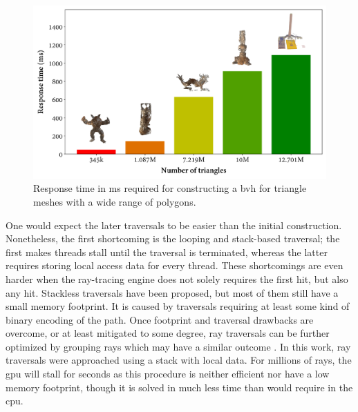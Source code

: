 \begin{figure}[ht]
    \includegraphics{figs/fundamentals/bvh_time.png}
	\caption{Response time in \si{\milli\second} required for constructing a \acrshort{bvh} for triangle meshes with a wide range of polygons. }
    \label{fig:bvh_time}
\end{figure}

One would expect the later traversals to be easier than the initial construction. Nonetheless, the first shortcoming is the looping and stack-based traversal; the first makes threads stall until the traversal is terminated, whereas the latter requires storing local access data for every thread. These shortcomings are even harder when the ray-tracing engine does not solely requires the first hit, but also any hit. Stackless traversals have been proposed, but most of them still have a small memory footprint\cite{meister_survey_2021}. It is caused by traversals requiring at least some kind of binary encoding of the path. Once footprint and traversal drawbacks are overcome, or at least mitigated to some degree, ray traversals can be further optimized by grouping rays which may have a similar outcome \cite{hendrich_ray_2019}. In this work, ray traversals were approached using a stack with local data. For millions of rays, the \acrshort{gpu} will stall for seconds as this procedure is neither efficient nor have a low memory footprint, though it is solved in much less time than would require in the \acrshort{cpu}. 

